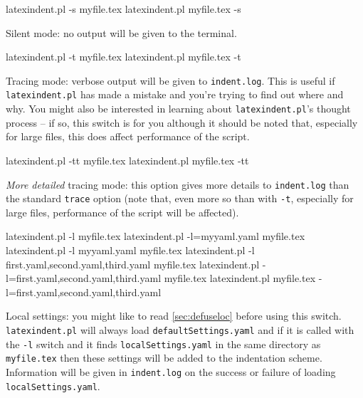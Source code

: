 \begin{commandshell}
latexindent.pl -s myfile.tex
latexindent.pl myfile.tex -s
      \end{commandshell}

Silent mode: no output will be given to the terminal.

\begin{commandshell}
latexindent.pl -t myfile.tex
latexindent.pl myfile.tex -t
      \end{commandshell}

\label{page:traceswitch}
Tracing mode: verbose output will be given to \texttt{indent.log}. This
is useful if \texttt{latexindent.pl} has made a mistake and you're
trying to find out where and why. You might also be interested in learning
about \texttt{latexindent.pl}'s thought process -- if so, this
switch is for you although it should be noted that, especially for large files, this does affect
performance of the script.

\begin{commandshell}
latexindent.pl -tt myfile.tex
latexindent.pl myfile.tex -tt
      \end{commandshell}

\emph{More detailed} tracing mode: this option gives more details to \texttt{indent.log}
than the standard \texttt{trace} option (note that, even more so than with \texttt{-t},
especially for large files, performance of the script will be affected).

\begin{commandshell}
latexindent.pl -l myfile.tex
latexindent.pl -l=myyaml.yaml myfile.tex
latexindent.pl -l myyaml.yaml myfile.tex
latexindent.pl -l first.yaml,second.yaml,third.yaml myfile.tex
latexindent.pl -l=first.yaml,second.yaml,third.yaml myfile.tex
latexindent.pl myfile.tex -l=first.yaml,second.yaml,third.yaml 
      \end{commandshell}

\label{page:localswitch}
Local settings: you might like to read \cref{sec:defuseloc} before
using this switch. \texttt{latexindent.pl} will always load \texttt{defaultSettings.yaml}
and if it is called with the \texttt{-l} switch and it finds \texttt{localSettings.yaml}
in the same directory as \texttt{myfile.tex} then these settings will be
added to the indentation scheme. Information will be given in \texttt{indent.log} on
the success or failure of loading \texttt{localSettings.yaml}.

